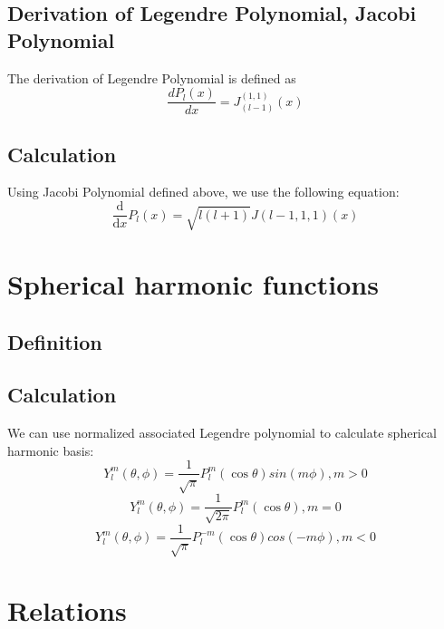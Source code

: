 \documentclass{article}
\newcommand{\ddx}{\frac{\mathrm{d}}{\mathrm{d}x}}
\begin{document}
\subsection{Derivation of Legendre Polynomial, Jacobi Polynomial}
The derivation of Legendre Polynomial is defined as
\begin{equation}
\frac{d P_l(x)}{dx} =  J_{(l-1)}^{(1,1)}(x)
\end{equation}
\subsection{Calculation}
Using Jacobi Polynomial defined above, we use the following equation:
\begin{equation}
\ddx P_l(x) = \sqrt{l(l+1)}J(l-1,1,1)(x)
\end{equation}
\section{Spherical harmonic functions}
\subsection{Definition}
\subsection{Calculation}
We can use normalized associated Legendre polynomial to calculate spherical harmonic basis:
\begin{equation}
Y_l^m(\theta, \phi) = \frac{1}{\sqrt{\pi}}P_l^m(\cos \theta) sin(m\phi), m>0
\end{equation}
\begin{equation}
Y_l^m(\theta, \phi) = \frac{1}{\sqrt{2\pi}}P_l^m(\cos \theta), m=0
\end{equation}
\begin{equation}
Y_l^m(\theta, \phi) = \frac{1}{\sqrt{\pi}}P_l^{-m}(\cos \theta) cos(-m\phi), m<0
\end{equation}
\section{Relations}
\end{document}
